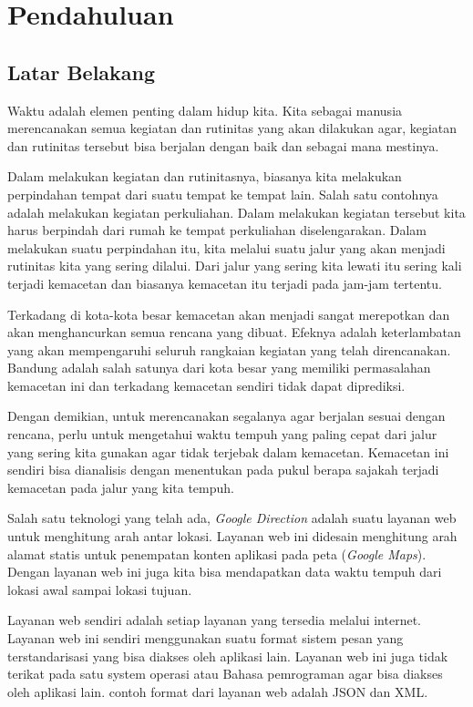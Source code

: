 \chapter{Pendahuluan}
\label{chap:intro}
   
\section{Latar Belakang}
\label{sec:label}
Waktu adalah elemen penting dalam hidup kita. Kita sebagai manusia merencanakan semua kegiatan dan rutinitas yang akan dilakukan agar, kegiatan dan rutinitas tersebut bisa berjalan dengan baik dan sebagai mana mestinya.

Dalam melakukan kegiatan dan rutinitasnya, biasanya kita melakukan perpindahan tempat dari suatu tempat ke tempat lain. Salah satu contohnya adalah melakukan kegiatan perkuliahan. Dalam melakukan kegiatan tersebut kita harus berpindah dari rumah ke tempat perkuliahan diselengarakan. Dalam melakukan suatu perpindahan itu, kita melalui suatu jalur yang akan menjadi rutinitas kita yang sering dilalui. Dari jalur yang sering kita lewati itu sering kali terjadi kemacetan dan biasanya kemacetan itu terjadi pada jam-jam tertentu. 

Terkadang di kota-kota besar kemacetan akan menjadi sangat merepotkan dan akan menghancurkan semua rencana yang dibuat. Efeknya adalah keterlambatan
yang akan mempengaruhi seluruh rangkaian kegiatan yang telah direncanakan. Bandung adalah salah satunya dari kota besar yang memiliki permasalahan kemacetan ini dan terkadang kemacetan sendiri tidak dapat diprediksi.

Dengan demikian, untuk merencanakan segalanya agar berjalan sesuai dengan rencana, perlu untuk mengetahui waktu tempuh yang paling cepat dari jalur yang sering kita gunakan agar tidak terjebak dalam kemacetan. Kemacetan ini sendiri bisa dianalisis dengan menentukan pada pukul berapa sajakah terjadi kemacetan pada jalur yang kita tempuh.

Salah satu teknologi yang telah ada, \textit{Google Direction} adalah suatu layanan web untuk menghitung arah antar lokasi. Layanan web ini didesain menghitung arah alamat statis untuk penempatan konten aplikasi pada peta (\textit{Google Maps}). Dengan layanan web ini juga kita bisa mendapatkan data waktu tempuh dari lokasi awal sampai lokasi tujuan.

Layanan web sendiri adalah setiap layanan yang tersedia melalui internet.
Layanan web ini sendiri menggunakan suatu format sistem pesan yang terstandarisasi yang bisa diakses oleh aplikasi lain. Layanan web ini juga tidak terikat pada satu system operasi atau Bahasa pemrograman agar bisa diakses oleh aplikasi lain. contoh format dari layanan web adalah JSON dan XML.

